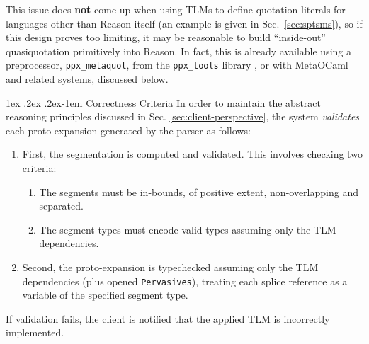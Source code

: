 \documentclass[acmsmall,screen]{acmart}
\makeatletter
\renewcommand{\subsubsection}{%
  \@startsection{subsubsection}{3}%
  {\z@}{1ex \@plus .2ex \@minus .2ex}{-1em}%
  {\sffamily\normalsize\itshape\maybe@addperiod}%
}
\newcommand{\maybe@addperiod}[1]{%
  #1\@addpunct{.}%
}
\newcommand{\li}[1]{\lstinline[basicstyle=\ttfamily\fontsize{9pt}{1em}\selectfont]{#1}}
\makeatother
\begin{document}
This issue does \textbf{not} come up when using TLMs to define quotation literals for languages other than Reason itself (an example is given in Sec.~\ref{sec:sptsms}), so if this design proves too limiting, it may be reasonable to build ``inside-out'' quasiquotation primitively into Reason. In fact, this is already available using a preprocessor, \li{ppx_metaquot}, from the \li{ppx_tools} library \cite{ppx-tools}, or with MetaOCaml and related systems, discussed below. %




\subsubsection{Correctness Criteria}
\label{sec:correctness-criteria}
In order to maintain the abstract reasoning principles discussed in Sec. \ref{sec:client-perspective}, the system \emph{validates} each proto-expansion generated by the parser as follows:
\begin{enumerate}
  \item First, the segmentation is computed and validated. This involves checking two criteria:
    \begin{enumerate}
      \item The segments must be in-bounds, of positive extent, non-overlapping and separated.
      \item The segment types must encode valid types assuming only the TLM dependencies.
    \end{enumerate}
  \item Second, the proto-expansion is typechecked assuming only the TLM dependencies (plus opened \li{Pervasives}), treating each splice reference as a variable of the specified segment type.
\end{enumerate}
If validation fails, the client is notified that the applied TLM is incorrectly implemented.%
\end{document}
